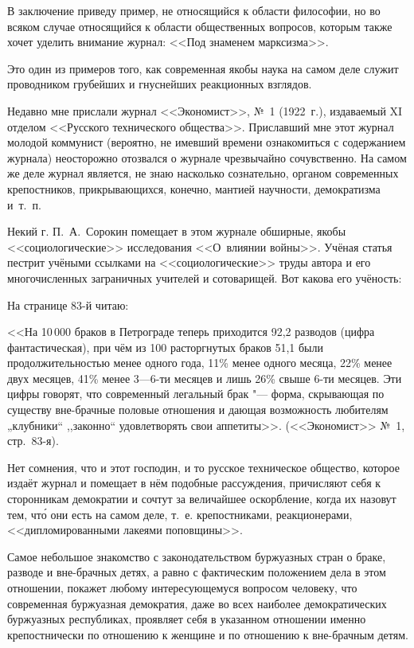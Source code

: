 В заключение приведу пример, не относящийся к области философии, но во
всяком случае относящийся к области общественных вопросов, которым также
хочет уделить внимание журнал: <<Под знаменем марксизма>>.

Это один из примеров того, как современная якобы наука на самом деле служит
проводником грубейших и гнуснейших реакционных взглядов.

Недавно мне прислали журнал <<Экономист>>, №~1 (1922~г.),
издаваемый XI отделом <<Русского технического общества>>. Приславший мне этот
журнал молодой коммунист (вероятно, не имевший времени ознакомиться с
содержанием журнала) неосторожно отозвался о журнале чрезвычайно
сочувственно. На самом же деле журнал является, не знаю насколько
сознательно, органом современных крепостников, прикрывающихся, конечно,
мантией научности, демократизма и~т.~п.

Некий г. П.~А.~Сорокин помещает в этом
журнале обширные, якобы <<социологические>> исследования <<О~влиянии войны>>.
Учёная статья пестрит учёными ссылками на <<социологические>> труды автора и
его многочисленных заграничных учителей и сотоварищей. Вот какова его
учёность:

На странице 83-й читаю:

<<На 10\,000 браков в Петрограде теперь приходится 92,2 разводов (цифра
фантастическая), при чём из 100 расторгнутых браков 51,1 были
продолжительностью менее одного года, 11\% менее одного месяца, 22\% менее
двух месяцев, 41\% менее 3---6-ти месяцев и лишь 26\% свыше 6-ти месяцев.
Эти цифры говорят, что современный легальный брак "--- форма, скрывающая по
существу вне-брачные половые отношения и дающая возможность любителям
„клубники“ ,,законно`` удовлетворять свои аппетиты>>. (<<Экономист>>
№~1, стр.~83-я).

Нет сомнения, что и этот господин, и то русское техническое общество,
которое издаёт журнал и помещает в нём подобные рассуждения, причисляют
себя к сторонникам демократии и сочтут за величайшее оскорбление, когда их
назовут тем, чт\'{о} они есть на самом деле, т.~е. крепостниками,
реакционерами, <<дипломированными лакеями поповщины>>.

Самое небольшое знакомство с законодательством буржуазных стран о браке,
разводе и вне-брачных детях, а равно с фактическим положением дела в этом
отношении, покажет любому интересующемуся вопросом человеку, что
современная буржуазная демократия, даже во всех наиболее демократических
буржуазных республиках, проявляет себя в указанном отношении именно
крепостнически по отношению к женщине и по отношению к вне-брачным детям.


